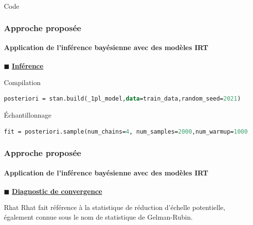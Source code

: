 \documentclass[aspectratio=169,professionalfonts, 12pt]{beamer}
\begin{document}
\begin{frame}[fragile]{Code}
  \frametitle{Approche proposée}
  \framesubtitle{Application de l'inférence bayésienne avec des modèles IRT}
  \(\displaystyle \blacksquare \) \textbf{\underline{ Inférence }}

  \justifying 
  \begin{minipage}{\textwidth}
  \begin{block}{Compilation}
    \begin{lstlisting}[language=Stan,basicstyle=\small,framesep=4.5mm,framexleftmargin=2.5mm,tabsize=2]
      posteriori = stan.build(_1pl_model,data=train_data,random_seed=2021)
    \end{lstlisting}
  \end{block}
  \begin{block}{\'Echantillonnage}
    \begin{lstlisting}[language=Stan,basicstyle=\small,framesep=4.5mm,framexleftmargin=2.5mm,tabsize=2]
      fit = posteriori.sample(num_chains=4, num_samples=2000,num_warmup=1000,num_thin=1)
    \end{lstlisting}
  \end{block}
  \end{minipage}
\end{frame}

\begin{frame}
  \frametitle{Approche proposée}
  \framesubtitle{Application de l'inférence bayésienne avec des modèles IRT}
  \(\displaystyle \blacksquare \) \textbf{\underline{ Diagnostic de convergence }} \\
  \justifying 
  \begin{minipage}{\textwidth}
  \begin{block}{Rhat}
    Rhat fait référence à la statistique de réduction d'échelle potentielle, également connue sous le nom de statistique de Gelman-Rubin.
  \end{block}
  \end{minipage}
 
\end{frame}
\end{document}
